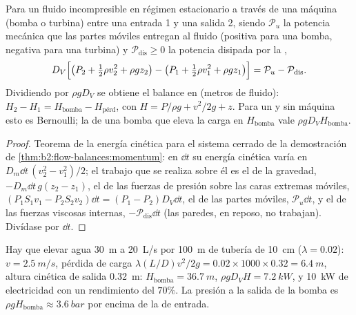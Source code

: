 \begin{theorem}\label{thm:b2:flow-balances:energy}
Para un fluido incompresible en régimen estacionario a través de una
máquina (bomba o turbina) entre una entrada 1 y una salida 2, siendo
$\mathcal P_u$ la potencia mecánica que las partes móviles entregan al
fluido (positiva para una bomba, negativa para una turbina) y
$\mathcal P_{\text{dis}} \ge 0$ la potencia disipada por la ,
\[
D_V\Bigl[\bigl(P_2 + \tfrac12\rho v_2^2 + \rho gz_2\bigr) - \bigl(P_1 + \tfrac12\rho v_1^2
+ \rho gz_1\bigr)\Bigr] = \mathcal P_u - \mathcal P_{\text{dis}} .
\]
Dividiendo por $\rho gD_V$ se obtiene el balance en \emph{}
(metros de fluido): $H_2 - H_1 = H_{\text{bomba}} - H_{\text{pérd}}$, con $H = P/\rho g +
v^2/2g + z$. Para un  y sin máquina esto es Bernoulli; la
\emph{} de una bomba que eleva la carga en $H_{\text{bomba}}$ vale
$\rho gD_VH_{\text{bomba}}$.
\end{theorem}

\begin{proof}
Teorema de la energía cinética para el sistema cerrado de la demostración
de \cref{thm:b2:flow-balances:momentum}: en $\dd t$ su energía cinética
varía en $D_m\dd t\,(v_2^2 - v_1^2)/2$; el trabajo que se realiza sobre él
es el de la gravedad, $-D_m\dd t\,g(z_2 - z_1)$, el de las fuerzas de
presión sobre las caras extremas móviles, $(P_1S_1v_1 - P_2S_2v_2)\dd t = (P_1 - P_2)D_V\dd t$, el de las
partes móviles, $\mathcal P_u\dd t$, y el de las fuerzas viscosas internas,
$-\mathcal P_{\text{dis}}\dd t$ (las paredes, en reposo, no trabajan). Divídase por
$\dd t$.
\end{proof}

\begin{example}\label{ex:b2:flow-balances:pump}
Hay que elevar agua \qty{30}{m} a \qty{20}{L/s} por \qty{100}{m} de tubería
de \qty{10}{cm} ($\lambda = 0.02$): $v = \qty{2.5}{m/s}$, pérdida de carga $\lambda(L/D)
v^2/2g = 0.02 \times 1000 \times 0.32 = \qty{6.4}{m}$, altura cinética de salida
\qty{0.32}{m}: $H_{\text{bomba}} = \qty{36.7}{m}$,  $\rho gD_VH =
\qty{7.2}{kW}$, y \qty{10}{kW} de electricidad con un rendimiento del $70\%$. La
presión a la salida de la bomba es $\rho gH_{\text{bomba}} \approx \qty{3.6}{bar}$ por encima
de la de entrada.
\end{example}

